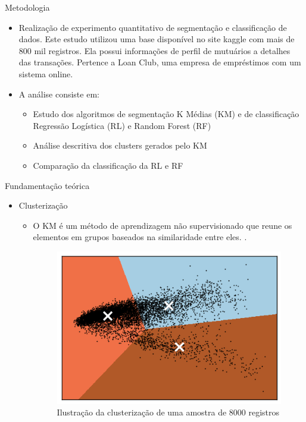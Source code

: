 \documentclass[final,hyperref={pdfpagelabels=false, brazil}]{beamer}
\let\olditem=\item%
\renewcommand{\item}{\olditem \justifying}%
\begin{document}
\begin{frame}[t]
\begin{columns}[t]
\begin{column}{.465\textwidth}

\begin{block}{Metodologia}


\begin{itemize}
\item Realização de experimento quantitativo de segmentação e classificação de dados. Este estudo utilizou uma base disponível no site kaggle\cite{KAGGLE} com mais de 800 mil registros. Ela possui informações de perfil de mutuários a detalhes das transações. Pertence a Loan Club, uma empresa de empréstimos com um sistema online.

\item A análise consiste em:
\begin{itemize}
\item Estudo dos algoritmos de segmentação K Médias (KM) e de classificação Regressão Logística (RL) e Random Forest (RF)
\item Análise descritiva dos clusters gerados pelo KM
\item Comparação da classificação da RL e RF
\end{itemize}
\end{itemize}

\end{block}


\begin{block}{Fundamenta\c c\~ao te\'orica}

\begin{itemize}
\item Clusterização
\begin{itemize}
\item O KM é um método de aprendizagem não supervisionado que reune os elementos em grupos baseados na similaridade entre eles.  \cite{MacQueen}. 

\begin{figure}
\centering
\caption{Ilustração da clusterização de uma amostra de 8000 registros}
\includegraphics[width=0.65\linewidth]{cluster.png}
\end{figure}


\end{itemize}
\end{itemize}
\end{block}
\end{column}
\end{columns}
\end{frame}
\end{document}
